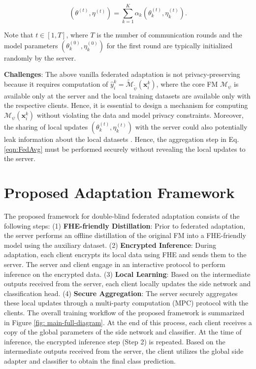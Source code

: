 \begin{equation}
   \left(\theta^{(t)},\eta^{(t)}\right) = \sum_{k=1}^{K} \alpha_k \left(\theta_k^{(t)},\eta_k^{(t)}\right).
   \label{eqn:FedAvg}
\end{equation}

\noindent Note that $t \in [1,T]$, where $T$ is the number of communication rounds and the model parameters $(\theta_k^{(0)},\eta_k^{(0)})$ for the first round are typically initialized randomly by the server. 

\noindent \textbf{Challenges}: The above vanilla federated adaptation is not privacy-preserving because it requires computation of $\hat{y}_i^k = \widetilde{\mathcal{M}}_{\widetilde{\psi}}(\mathbf{x}_i^k)$, where the core FM $\mathcal{M}_{\psi}$ is available only at the server and the local training datasets are available only with the respective clients. Hence, it is essential to design a mechanism for computing $\mathcal{M}_{\psi}(\mathbf{x}_i^k)$ without violating the data and model privacy constraints. Moreover, the sharing of local updates $\left(\theta_k^{(t)},\eta_k^{(t)}\right)$ with the server could also potentially leak information about the local datasets \cite{zhu2019deep}. Hence, the aggregation step in Eq. \ref{eqn:FedAvg} must be performed securely without revealing the local updates to the server.

\section{Proposed Adaptation Framework}

The proposed framework for double-blind federated adaptation consists of the following steps: (1) \textbf{FHE-friendly Distillation}: Prior to federated adaptation, the server performs an offline distillation of the original FM into a FHE-friendly model using the auxiliary dataset. (2) \textbf{Encrypted Inference}: During adaptation, each client encrypts its local data using FHE and sends them to the server. The server and client engage in an interactive protocol to perform inference on the encrypted data. (3) \textbf{Local Learning}:  Based on the intermediate outputs received from the server, each client locally updates the side network and classification head. (4) \textbf{Secure Aggregation}: The server securely aggregates these local updates through a multi-party computation (MPC) protocol with the clients. The overall training workflow of the proposed framework is summarized in Figure \ref{fig: main-full-diagram}. At the end of this process, each client receives a copy of the global parameters of the side network and classifier. At the time of inference, the encrypted inference step (Step 2) is repeated. Based on the intermediate outputs received from the server, the client utilizes the global side adapter and classifier to obtain the final class prediction. 

